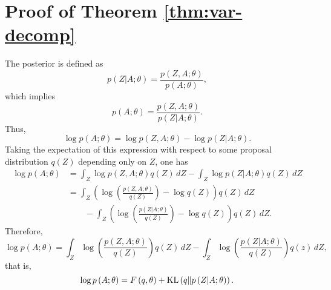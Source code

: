 \documentclass[../../main.tex]{subfiles} %
\begin{document}
\section{Proof of Theorem \ref{thm:var-decomp}} \label{app:proof-var-decomp}

The posterior is defined as
\begin{equation*}
	p \left( Z \vert A; \theta \right) = \frac{p \left(Z, A; \theta \right)}
	{p \left( A; \theta \right)},
\end{equation*}
which implies
\begin{equation*}
	p \left( A; \theta \right) = \frac{p \left( Z, A; \theta \right)}
	{p \left( Z \vert A; \theta \right)}.
\end{equation*}
Thus,
\begin{equation*}
	\log p \left( A; \theta \right) = \log p \left( Z, A; \theta \right)
	- \log p \left( Z \vert A; \theta \right).
\end{equation*}
Taking the expectation of this expression with respect to some proposal
distribution \(q(Z)\) depending only on \(Z\), one has
\begin{align*}
	\log p \left( A; \theta \right) 
	&= \int_{Z} \log p \left( Z, A; \theta
	\right) q \left( Z \right) \, dZ - \int_{Z} \log p \left( Z \vert A;
	\theta \right) q \left( Z \right) \, dZ \\
	&= \int_{Z} \left( \log \left( \frac{p \left( Z, A; \theta \right)}{q
		\left( Z \right)} \right) - \log q \left( Z \right) \right) q \left( Z
	\right) \, dZ \\
	&\qquad - \int_{Z} \left( \log \left( \frac{p \left( Z \vert A; \theta 
		\right)}
	{q \left( Z \right)} \right) - \log q \left( Z \right) \right) q \left( 
	Z \right) \, dZ.
\end{align*}
Therefore,
\begin{equation*}
	\log p \left( A; \theta \right) = \int_{Z} \log \left(
	\frac{p \left( Z, A; \theta \right)}{q(Z)} \right) q(Z) \, dZ -
	\int_{Z} \log \left( \frac{p \left( Z \vert A; \theta \right)}{q(Z)}
	\right) q(z) \, dZ,
\end{equation*}
that is,
\begin{equation*}
	\log p \left( A; \theta \right) = F \left(q, \theta \right) +
	\operatorname{KL}\left(q \Vert p \left( Z \vert A; \theta \right) \right).
\end{equation*}
\end{document}
